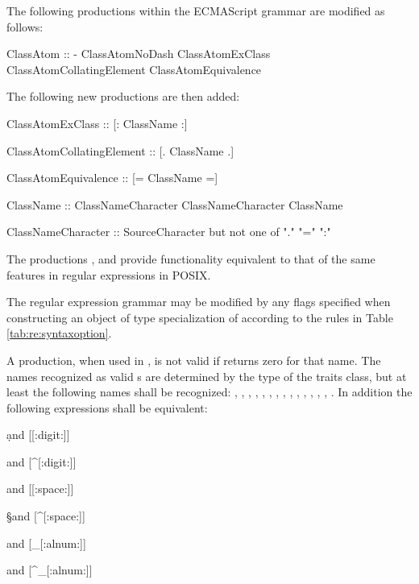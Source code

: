 \pnum
The following productions within the ECMAScript grammar are modified as follows:

\begin{codeblock}
ClassAtom ::
  -
  ClassAtomNoDash
  ClassAtomExClass
  ClassAtomCollatingElement
  ClassAtomEquivalence
\end{codeblock}

\pnum
The following new productions are then added:

\begin{codeblock}
ClassAtomExClass ::
  [: ClassName :]

ClassAtomCollatingElement ::
  [. ClassName .]

ClassAtomEquivalence ::
  [= ClassName =]

ClassName ::
  ClassNameCharacter
  ClassNameCharacter ClassName

ClassNameCharacter ::
  SourceCharacter but not one of "." "=" ":"
\end{codeblock}

\pnum
The productions , 
and  provide functionality
equivalent to that of the same features in regular expressions in POSIX.

\pnum
The regular expression grammar may be modified by
any  flags specified when
constructing an object of type specialization of 
according to the rules in Table \ref{tab:re:syntaxoption}.

\pnum
A  production, when used in ,
is not valid if  returns zero for
that name.  The names recognized as valid s are
determined by the type of the traits class, but at least the following
names shall be recognized: 
, , , , , 
, , , , , 
, , , , .
In addition the following expressions shall be equivalent:

\begin{codeblock}
\d and [[:digit:]]

\D and [^[:digit:]]

\s and [[:space:]]

\S and [^[:space:]]

\w and [_[:alnum:]]

\W and [^_[:alnum:]]
\end{codeblock}

